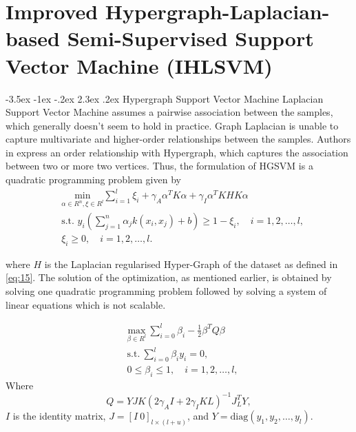 \documentclass[12pt,a4paper,oneside,english]{report}
\makeatletter
\renewcommand\section{\@startsection {section}{1}{\z@}%
                                   {-3.5ex \@plus -1ex \@minus -.2ex}%
                                   {2.3ex \@plus.2ex}%
                                   {\centering\normalfont\LARGE\bfseries}}
\makeatother
\begin{document}

\newpage
\chapter{Improved Hypergraph-Laplacian-based Semi-Supervised Support Vector Machine (IHLSVM)}

\section{Hypergraph Support Vector Machine}
Laplacian Support Vector Machine assumes a pairwise association between the samples, which generally doesn't seem to hold in practice. Graph Laplacian is unable to capture multivariate and higher-order relationships between the samples. Authors in \cite{bsun2022hypergraph} express an order relationship with Hypergraph, which captures the association between two or more two vertices. Thus, the formulation of HGSVM is a quadratic programming problem given by
\begin{align}
    &\underset {\alpha \in R^n, \xi \in R^l }{\mathrm{min}} \sum_{i=1}^l \xi_i 
    + \gamma_A \alpha^T K \alpha 
    + \gamma_I \alpha^T KHK \alpha \nonumber \\
    &\text{s.t. } y_i\left(\sum_{j=1}^n \alpha_j k(x_i, x_j) + b\right) \geq 1 - \xi_i, \quad i = 1, 2, \ldots, l, \nonumber \\
    &\xi_i \geq 0, \quad i = 1, 2, \ldots, l. 
\end{align}


where \(H\) is the Laplacian regularised Hyper-Graph of the dataset as defined in \eqref{eq:15}.  The solution of the optimization, as mentioned earlier, is obtained by solving one quadratic programming problem followed by solving a system of linear equations which is not scalable.

\begin{align}
    &\underset{\beta \in R^l}{\mathrm{max}} \ \sum_{i=0}^l \beta_i - \frac{1}{2} \beta^T Q \beta \nonumber \\
    &\text{s.t.} \ \sum_{i=0}^l \beta_i y_i = 0, \nonumber \\
    &0 \leq \beta_i \leq 1, \quad i = 1, 2, \ldots, l,
\end{align}
Where 
\[
Q = Y J K \left(2\gamma_A I + 2\gamma_I K L\right)^{-1} J_L^T Y,
\]
\( I \) is the identity matrix, \( J = [I \ 0]_{l \times (l+u)} \), and \( Y = \mathrm{diag}(y_1, y_2, \ldots, y_l) \).


\end{document}
